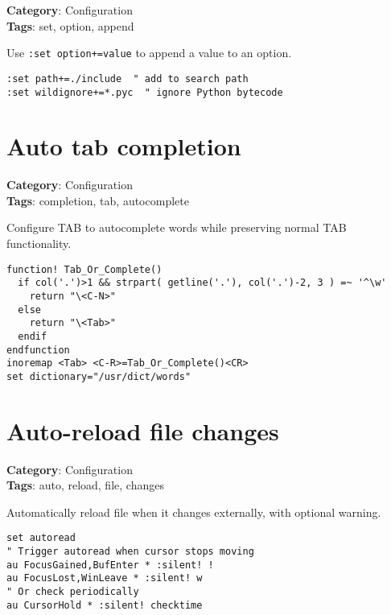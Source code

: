 {{{\textbf{Category}: Configuration\\ \textbf{Tags}: set, option, append
\vspace{0.5cm}

Use {\footnotesize \Verb§:set option+=value§} to append a value to an option.

\begin{Exa*}{}
\begin{Verbatim}[fontsize=\footnotesize, breaklines, breakanywhere]
:set path+=./include  " add to search path
:set wildignore+=*.pyc  " ignore Python bytecode
\end{Verbatim}
\end{Exa*}

\section{Auto tab completion}

\textbf{Category}: Configuration\\ \textbf{Tags}: completion, tab, autocomplete
\vspace{0.5cm}

Configure TAB to autocomplete words while preserving normal TAB functionality.

\begin{Exa*}{}
\begin{Verbatim}[fontsize=\footnotesize, breaklines, breakanywhere]
function! Tab_Or_Complete()
  if col('.')>1 && strpart( getline('.'), col('.')-2, 3 ) =~ '^\w'
    return "\<C-N>"
  else
    return "\<Tab>"
  endif
endfunction
inoremap <Tab> <C-R>=Tab_Or_Complete()<CR>
set dictionary="/usr/dict/words"
\end{Verbatim}
\end{Exa*}

\section{Auto-reload file changes}

\textbf{Category}: Configuration\\ \textbf{Tags}: auto, reload, file, changes
\vspace{0.5cm}

Automatically reload file when it changes externally, with optional warning.

\begin{Exa*}{}
\begin{Verbatim}[fontsize=\footnotesize, breaklines, breakanywhere]
set autoread
" Trigger autoread when cursor stops moving
au FocusGained,BufEnter * :silent! !
au FocusLost,WinLeave * :silent! w
" Or check periodically
au CursorHold * :silent! checktime
\end{Verbatim}
\end{Exa*}

}}}

